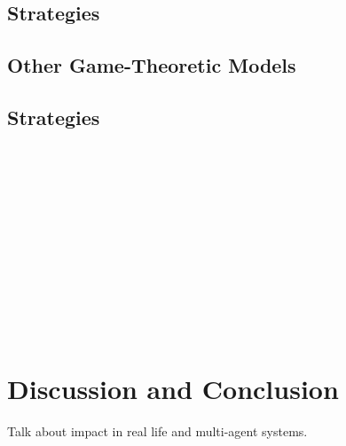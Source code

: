 \documentclass[twoside,twocolumn]{article}
\begin{document}
\subsection{Strategies}

\subsection{Other Game-Theoretic Models}

\subsection{Strategies}


~\cite{arithmetics_of_mutual_help}\\
~\cite{five_rules_coop}\\
~\cite{evolution_of_cooperation}\\
~\cite{evol_indirect_image}\\
~\cite{evol_graph}\\
~\cite{multilevel_nowak}\\
~\cite{phelps_game_theoretic_analysis}\\
~\cite{spatial}\\
~\cite{heterogenous}\\
~\cite{evoldirindir}\\
~\cite{extortion}\\


\section{Discussion and Conclusion}
Talk about impact in real life and multi-agent systems.\\
~\cite{sticklebacks}\\
~\cite{prisonersdilemma}\\



{}


\end{document}
